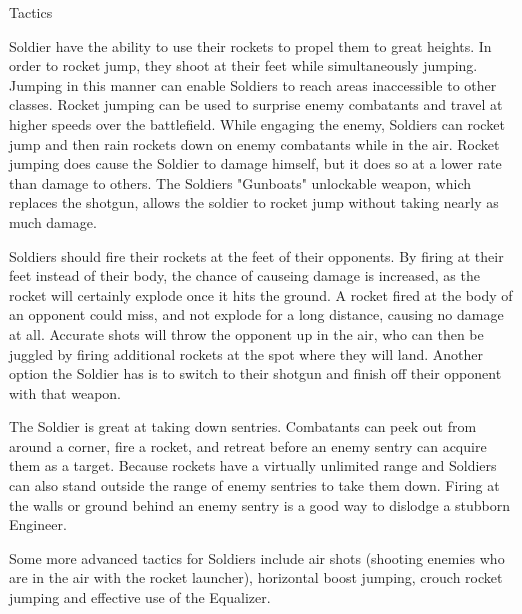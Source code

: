 Tactics 

Soldier have the ability to use their rockets to propel them to great heights.  In order to rocket jump, they shoot at their feet while simultaneously jumping. Jumping in this manner can enable Soldiers to reach areas inaccessible to other classes. Rocket jumping can be used to surprise enemy combatants and travel at higher speeds over the battlefield. While engaging the enemy, Soldiers can rocket jump and then rain rockets down on enemy combatants while in the air. Rocket jumping does cause the Soldier to damage himself, but it does so at a lower rate than damage to others. The Soldiers "Gunboats" unlockable weapon, which replaces the shotgun, allows the soldier to rocket jump without taking nearly as much damage.

Soldiers should fire their rockets at the feet of their opponents.  By firing at their feet instead of their body, the chance of causeing damage is increased, as the rocket will certainly explode once it hits the ground.  A rocket fired at the body of an opponent could miss, and not explode for a long distance, causing no damage at all.  Accurate shots will throw the opponent up in the air, who can then be juggled by firing additional rockets at the spot where they will land.  Another option the Soldier has is to switch to their shotgun and finish off their opponent with that weapon.


The Soldier is great at taking down sentries. Combatants can peek out from around a corner, fire a rocket, and retreat before an enemy sentry can acquire them as a target. Because rockets have a virtually unlimited range and Soldiers can also stand outside the range of enemy sentries to take them down. Firing at the walls or ground behind an enemy sentry is a good way to dislodge a stubborn Engineer. 

Some more advanced tactics for Soldiers include air shots (shooting enemies who are in the air with the rocket launcher), horizontal boost jumping, crouch rocket jumping and effective use of the Equalizer.